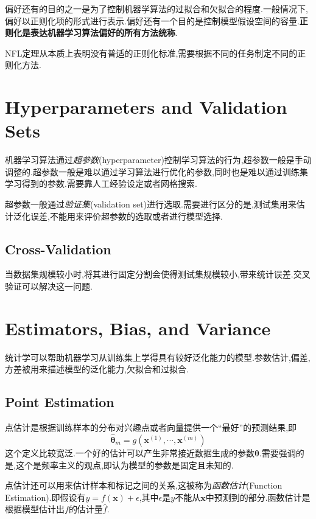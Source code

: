 偏好还有的目的之一是为了控制机器学算法的过拟合和欠拟合的程度.一般情况下,偏好以正则化项的形式进行表示.偏好还有一个目的是控制模型假设空间的容量.\textbf{正则化是表达机器学习算法偏好的所有方法统称}.

NFL定理从本质上表明没有普适的正则化标准,需要根据不同的任务制定不同的正则化方法.

\section{Hyperparameters and Validation Sets}

机器学习算法通过\textit{超参数}(hyperparameter)控制学习算法的行为,超参数一般是手动调整的.超参数一般是难以通过学习算法进行优化的参数,同时也是难以通过训练集学习得到的参数.需要靠人工经验设定或者网格搜索.

超参数一般通过\textit{验证集}(validation set)进行选取.需要进行区分的是,测试集用来估计泛化误差,不能用来评价超参数的选取或者进行模型选择.

\subsection{Cross-Validation}

当数据集规模较小时,将其进行固定分割会使得测试集规模较小,带来统计误差.交叉验证可以解决这一问题.

\section{Estimators, Bias, and Variance}

统计学可以帮助机器学习从训练集上学得具有较好泛化能力的模型.参数估计,偏差,方差被用来描述模型的泛化能力,欠拟合和过拟合.

\subsection{Point Estimation}

点估计是根据训练样本的分布对兴趣点或者向量提供一个``最好''的预测结果,即
\begin{equation}
\hat{\bm\theta}_m=g(\bm x^{(1)},\cdots,\bm x^{(m)})
\end{equation}
这个定义比较宽泛.一个好的估计可以产生非常接近数据生成的参数$\bm{\bm\theta}$.需要强调的是,这个是频率主义的观点,即认为模型的参数是固定且未知的.

点估计还可以用来估计样本和标记之间的关系,这被称为\textit{函数估计}(Function Estimation).即假设有$y=f(\bm x)+\epsilon$,其中$\epsilon$是$y$不能从$\bm x$中预测到的部分.函数估计是根据模型估计出$f$的估计量$\hat f$.

